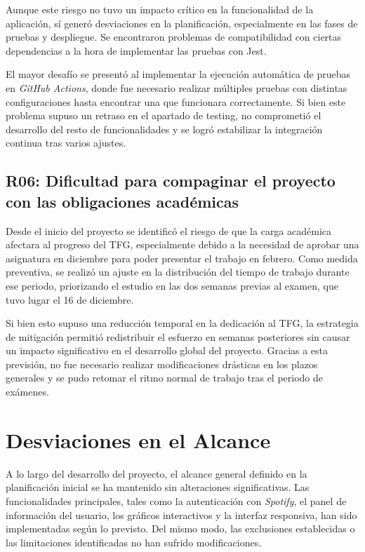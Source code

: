 Aunque este riesgo no tuvo un impacto crítico en la funcionalidad de la aplicación, sí generó desviaciones en la planificación, especialmente en las fases de pruebas y despliegue. Se encontraron problemas de compatibilidad con ciertas dependencias a la hora de implementar las pruebas con Jest.

El mayor desafío se presentó al implementar la ejecución automática de pruebas en \textit{GitHub Actions}, donde fue necesario realizar múltiples pruebas con distintas configuraciones hasta encontrar una que funcionara correctamente. Si bien este problema supuso un retraso en el apartado de testing, no comprometió el desarrollo del resto de funcionalidades y se logró estabilizar la integración continua tras varios ajustes.

\subsection*{R06: Dificultad para compaginar el proyecto con las obligaciones académicas}

Desde el inicio del proyecto se identificó el riesgo de que la carga académica afectara al progreso del TFG, especialmente debido a la necesidad de aprobar una asignatura en diciembre para poder presentar el trabajo en febrero. Como medida preventiva, se realizó un ajuste en la distribución del tiempo de trabajo durante ese periodo, priorizando el estudio en las dos semanas previas al examen, que tuvo lugar el 16 de diciembre.

Si bien esto supuso una reducción temporal en la dedicación al TFG, la estrategia de mitigación permitió redistribuir el esfuerzo en semanas posteriores sin causar un impacto significativo en el desarrollo global del proyecto. Gracias a esta previsión, no fue necesario realizar modificaciones drásticas en los plazos generales y se pudo retomar el ritmo normal de trabajo tras el periodo de exámenes.

\section{Desviaciones en el Alcance}

A lo largo del desarrollo del proyecto, el alcance general definido en la planificación inicial se ha mantenido sin alteraciones significativas. Las funcionalidades principales, tales como la autenticación con \textit{Spotify}, el panel de información del usuario, los gráficos interactivos y la interfaz responsiva, han sido implementadas según lo previsto. Del mismo modo, las exclusiones establecidas o las limitaciones identificadas no han sufrido modificaciones.

